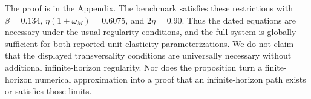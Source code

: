 The proof is in the Appendix. The benchmark satisfies these restrictions with
\(\beta=0.134\), \(\eta(1+\omega_M)=0.6075\), and \(2\eta=0.90\).
Thus the dated equations are necessary under the usual regularity conditions,
and the full system is globally sufficient for both reported unit-elasticity
parameterizations. We do not claim that the displayed transversality conditions
are universally necessary without additional infinite-horizon regularity. Nor
does the proposition turn a finite-horizon numerical approximation into a proof
that an infinite-horizon path exists or satisfies those limits.
